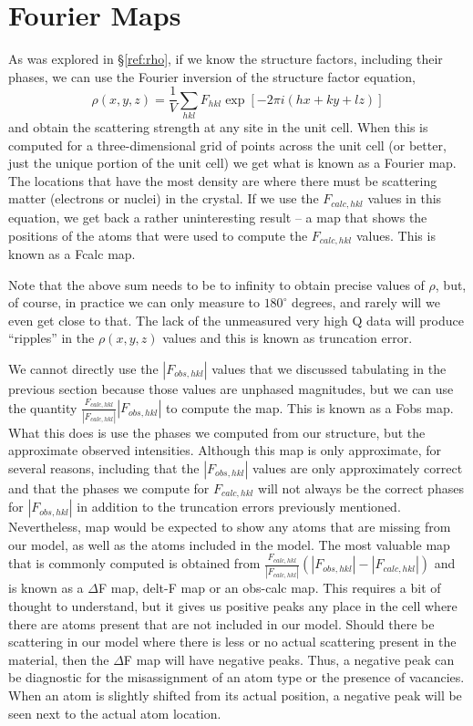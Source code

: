 \section{Fourier Maps}\label{ref:Fourier}

As was explored in \S\ref{ref:rho}, if we know the structure factors, including their phases, we can use the Fourier inversion of the structure factor equation,
$$\rho(x,y,z) = \frac{1}{V} \sum_{hkl}  F_{hkl} \exp⁡[-2\pi i(hx + ky + lz)] $$
and obtain the scattering strength at any site in the unit cell. When this is computed for a three-dimensional grid of points across the unit cell (or better, just the unique portion of the unit cell) we get what is known as a Fourier map. The locations that have the most density are where there must be scattering matter (electrons or nuclei) in the crystal. If we use the $F_{calc, hkl}$ values in this equation, we get back a rather uninteresting result -- a map that shows the positions of the atoms that were used to compute the $F_{calc, hkl}$ values. This is known as a Fcalc map.

Note that the above sum needs to be to infinity to obtain precise values of $\rho$, but, of course, in practice we can only measure to $180^\circ$ degrees, and rarely will we even get close to that. The lack of the unmeasured very high Q data will produce ``ripples'' in the $\rho(x,y,z)$ values and this is known as truncation error. 

We cannot directly use the $|F_{obs, hkl}|$ values that we discussed tabulating in the previous section because those values are unphased magnitudes, but we can use the quantity  $\frac{F_{calc, hkl}}{|F_{calc, hkl}|}|F_{obs, hkl}|$ to compute the map. This is known as a Fobs map. What this does is use the phases we computed from our structure, but the approximate observed intensities. Although this map is only approximate, for several reasons, including that the $|F_{obs, hkl}|$ values are only approximately correct and that the phases we compute for $F_{calc, hkl}$ will not always be the correct phases for $|F_{obs, hkl}|$ in addition to the truncation errors previously mentioned. Nevertheless, map would be expected to show any atoms that are missing from our model, as well as the atoms included in the model. 
The most valuable map that is commonly computed is obtained from $\frac{F_{calc, hkl}}{|F_{calc, hkl}|}(|F_{obs, hkl}| - |F_{calc, hkl}|)$ and is known as a $\Delta$F map, delt-F map or an obs-calc map. This requires a bit of thought to understand, but it gives us positive peaks any place in the cell where there are atoms present that are not included in our model. Should there be scattering in our model where there is less or no actual scattering present in the material, then the $\Delta$F map will have negative peaks. Thus, a negative peak can be diagnostic for the misassignment of an atom type or the presence of vacancies. When an atom is slightly shifted from its actual position, a negative peak will be seen next to the actual atom location. 

